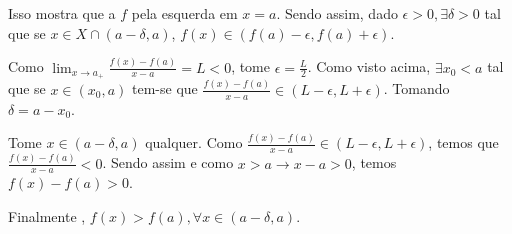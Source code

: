 Isso mostra que a \funcao $f$ \eh \continua pela esquerda em $x=a$. Sendo assim, dado $\epsilon > 0, \exists \delta > 0$ tal que se $x\in X \cap (a - \delta, a)$, \entao $f(x) \in (f(a) - \epsilon, f(a) + \epsilon)$. 

Como $\lim_{x\rightarrow a_+} \frac{f(x)-f(a)}{x-a} = L < 0$, tome $\epsilon = \frac{L}{2}$. Como visto acima, $\exists x_0 < a$ tal que se $x \in (x_0, a)$ tem-se que $\frac{f(x)-f(a)}{x-a} \in (L -\epsilon, L + \epsilon)$. Tomando $\delta = a - x_0$.

Tome $x \in (a - \delta, a)$ qualquer. Como $\frac{f(x)-f(a)}{x-a} \in (L -\epsilon, L + \epsilon)$, temos que  $\frac{f(x)-f(a)}{x-a} < 0$. Sendo assim e como $x > a \rightarrow x-a>0$, temos $f(x) - f(a) > 0$. 

Finalmente \entao, $f(x) > f(a), \forall x \in (a - \delta, a)$.






 











